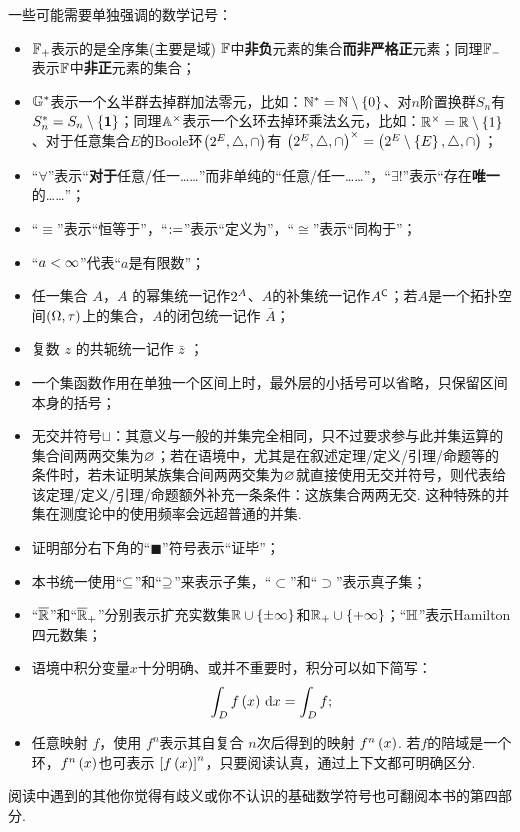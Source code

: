一些可能需要单独强调的数学记号：
\begin{itemize}
    \item $\bbF_+$表示的是全序集(主要是域) $\bbF$中\textbf{非负}元素的集合\textbf{而非严格正}元素；同理$\bbF_-$表示$\bbF$中\textbf{非正}元素的集合；
    \item $\bbG^*$表示一个幺半群去掉群加法零元，比如：$\N^*=\N\m\z\{0\y\}$、对$n$阶置换群$S_n$有$S_n^*=S_n\m\z\{\id\y\}$；同理$\bbA^\times$表示一个幺环去掉环乘法幺元，比如：$\R^\times=\R\m\z\{ 1 \y\}$、对于任意集合$E$的Boole环$\z( \pws{E},\triangle,\cap \y)$有 $\z( \pws{E},\triangle,\cap \y)^\times=\z( \pws{E}\m\z\{ E \y\},\triangle,\cap \y)$；
    \item “$\forall $”表示“\textbf{对于}任意/任一……”而非单纯的“任意/任一……”，“$\exists !$”表示“存在\textbf{唯一}的……”；
    \item “$\equiv$”表示“恒等于”，“$\defi$”表示“定义为”，“$\cong$”表示“同构于”；
    \item “$a<\wq$”代表“$a$是有限数”；
    \item 任一集合 $A$，$A$ 的幂集统一记作$\pws{A}$、$A$的补集统一记作$A\c$；若$A$是一个拓扑空间$\z(\Omega,\tau\y)$上的集合，$A$的闭包统一记作 $\bar{A}$；
    \item 复数 $z$ 的共轭统一记作 $\bar{z}$ ；
    \item 一个集函数作用在单独一个区间上时，最外层的小括号可以省略，只保留区间本身的括号；
    \item 无交并符号$\sqcup$：其意义与一般的并集完全相同，只不过要求参与此并集运算的集合间两两交集为$\vd$；若在语境中，尤其是在叙述定理/定义/引理/命题等的条件时，若未证明某族集合间两两交集为$\vd$就直接使用无交并符号，则代表给该定理/定义/引理/命题额外补充一条条件：这族集合两两无交. 这种特殊的并集在测度论中的使用频率会远超普通的并集.
    \item 证明部分右下角的“$\blacksquare$”符号表示“证毕”；
    \item 本书统一使用“$\sb$”和“$\sp$”来表示子集，“$\subset$”和“$\supset$”表示真子集；
    \item “$\bar{\R}$”和“$\bar{\R}_+$”分别表示扩充实数集$\R\cup\z\{\pm\wq\y\}$和$\R_+\cup\z\{ +\wq \y\}$；“$\H$”表示Hamilton四元数集；
    \item 语境中积分变量$x$十分明确、或并不重要时，积分可以如下简写：
    \[   \int_D f\z(x\y)\d x = \int_D f;   \]
    \item 任意映射 $f$，使用 $f^n$表示其自复合 $n$次后得到的映射 $f^n\z(x\y)$. 若$f$的陪域是一个环，$f^n\z(x\y)$也可表示 $\z[f\z(x\y)\y]^n$，只要阅读认真，通过上下文都可明确区分.
\end{itemize}
阅读中遇到的其他你觉得有歧义或你不认识的基础数学符号也可翻阅本书的第四部分.


